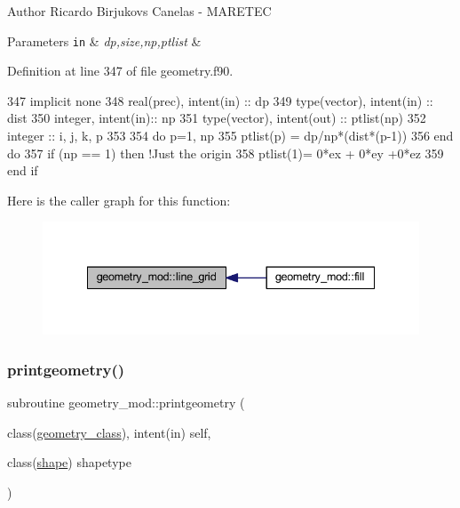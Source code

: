\begin{DoxyAuthor}{Author}
Ricardo Birjukovs Canelas -\/ M\+A\+R\+E\+T\+EC
\end{DoxyAuthor}

\begin{DoxyParams}[1]{Parameters}
\mbox{\tt in}  & {\em dp,size,np,ptlist} & \\
\hline
\end{DoxyParams}


Definition at line 347 of file geometry.\+f90.


\begin{DoxyCode}
347     \textcolor{keywordtype}{implicit none}
348     \textcolor{keywordtype}{real(prec)}, \textcolor{keywordtype}{intent(in)} :: dp
349     \textcolor{keywordtype}{type}(vector), \textcolor{keywordtype}{intent(in)} :: dist
350     \textcolor{keywordtype}{integer}, \textcolor{keywordtype}{intent(in)}::  np
351     \textcolor{keywordtype}{type}(vector), \textcolor{keywordtype}{intent(out)} :: ptlist(np)
352     \textcolor{keywordtype}{integer} :: i, j, k, p
353 
354     \textcolor{keywordflow}{do} p=1, np
355         ptlist(p) = dp/np*(dist*(p-1))
356 \textcolor{keywordflow}{    end do}
357     \textcolor{keywordflow}{if} (np == 1) \textcolor{keywordflow}{then} \textcolor{comment}{!Just the origin}
358         ptlist(1)= 0*ex + 0*ey +0*ez
359 \textcolor{keywordflow}{    end if}
\end{DoxyCode}
Here is the caller graph for this function\+:\nopagebreak
\begin{figure}[H]
\begin{center}
\leavevmode
\includegraphics[width=335pt]{namespacegeometry__mod_abcb09c0f5274c27cb79b0dd009ed94b3_icgraph}
\end{center}
\end{figure}
\mbox{\label{namespacegeometry__mod_aed4426181ca851b41717edd50268e5f3}} 
\subsubsection{\texorpdfstring{printgeometry()}{printgeometry()}}
{\footnotesize\ttfamily subroutine geometry\+\_\+mod\+::printgeometry (\begin{DoxyParamCaption}\item[{class(\mbox{\hyperlink{structgeometry__mod_1_1geometry__class}{geometry\+\_\+class}}), intent(in)}]{self,  }\item[{class(\mbox{\hyperlink{structgeometry__mod_1_1shape}{shape}})}]{shapetype }\end{DoxyParamCaption})\hspace{0.3cm}{\ttfamily [private]}}



